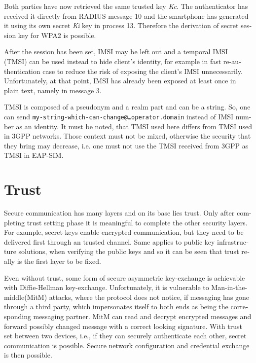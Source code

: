 \documentclass[12pt,a4paper,english]{tutthesis}
\begin{document}
\begin{otherlanguage}{english}
Both parties have now retrieved the same trusted key \emph{Kc}. The
authenticator has received it directly from RADIUS message 10 and the
smartphone has generated it using its own secret \emph{Ki} key in
process 13.
Therefore the derivation of secret session key for WPA2 is possible.

After the session has been set, IMSI may be left out and a temporal IMSI
(TMSI) can be used instead to hide client's identity, for example in
fast re-authentication case to reduce the risk of exposing the client's
IMSI unnecessarily. Unfortunately, at that point, IMSI has already
been exposed at least once in plain text, namely in message 3.

TMSI is composed of a pseudonym and a realm part and can be a
string. So, one can send 
\texttt{my-string-which-can-change@…operator.domain} instead of 
IMSI number as an identity. 
It must be noted, that TMSI used here differs from TMSI used in 3GPP
networks. Those context must not be mixed, otherwise the security that
they bring may decrease, i.e. one must not use the TMSI received from
3GPP as TMSI in EAP-SIM.
\section{Trust}
\label{sec-2-7}

Secure communication has many layers and on its base lies trust. 
Only after completing trust setting phase it is meaningful to complete
the other security layers. For example, secret keys enable encrypted
communication, but they need to be delivered first through an trusted
channel. Same applies to public key infrastructure solutions, when
verifying the public keys and so it can be seen that trust
really is the first layer to be fixed.



Even without trust, some form of secure asymmetric key-exchange is achievable
with Diffie-Hellman key-exchange\cite{diffie1976new}. Unfortunately, it is vulnerable
to Man-in-the-middle(MitM) attacks, where the protocol does not notice, 
if messaging has gone through a third party, which impersonates itself to 
both ends as being the corresponding messaging partner. MitM can
read and decrypt encrypted messages and forward possibly changed message with
a correct looking signature.
With trust set between two devices, i.e.,  if they can securely
authenticate each other, secret communication is possible. 
Secure network configuration and credential exchange is then possible.



\end{otherlanguage}
\end{document}
